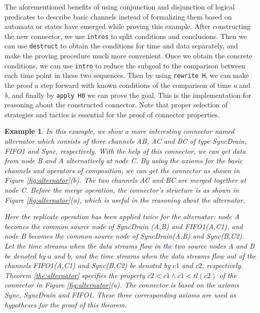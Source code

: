 \documentclass[preprint,3p]{elsarticle}
\newcommand{\liyi}[1]{\textcolor{blue}{#1}}
\newcommand{\xy}[1]{{#1}}
\newtheorem{example}{Example}[section]
\begin{document}
\xy{The aforementioned benefits of using conjunction and disjunction of logical predicates to describe basic channels instead of formalizing them based on automata or states have emerged while proving this example.}
After constructing the new connector, we use \texttt{intros} to split conditions and conclusions. Then we can use \texttt{destruct} to obtain the conditions for time and data separately,
and make the proving procedure much more convenient. \xy{Once we obtain the concrete conditions, we can use \texttt{intro} to reduce the subgoal to the comparison between each time point in these two sequences.} Then by using \texttt{rewrite H}, we can make
the proof a step forward with known conditions of the comparison of time \emph{a} and \emph{b}, and finally by
\texttt{apply H0} we can prove the goal. This is the implementation for reasoning about the constructed connector.
Note that proper selection of strategies and tactics is essential for the proof of connector properties.


\begin{example}\label{ex:alternator}
In this example, we show a more interesting connector named \emph{alternator} which consists of three channels \emph{AB}, \emph{AC} and \emph{BC} of type SyncDrain, FIFO1 and Sync, respectively. With the help of this connector, we can get data from node \emph{B} and \emph{A} alternatively at node \emph{C}.
By using the axioms for the basic channels and operators of composition, we can get the connector as shown in Figure \ref{fig:alternator}(b). The two
channels \emph{AC} and \emph{BC} are merged together at node \emph{C}. Before the merge operation, the connector's structure is as shown in
Figure \ref{fig:alternator}(a), which is useful in the reasoning about the alternator.

Here the replicate operation has been applied twice for the alternator: node \emph{A} becomes the common source node of \emph{SyncDrain (A,B)} and \emph{FIFO1(A,C1)}, and node \emph{B} becomes the common source node of \emph{SyncDrain(A,B)} and \emph{Sync(B,C2)}. Let the time streams when the
data streams flow \liyi{in the} two source nodes \emph{A} and \emph{B} be denoted by $a$ and $b$, and the time streams when the data streams
flow out of the channels \emph{FIFO1(A,C1)} and \emph{Sync(B,C2)} be denoted by $c1$ and $c2$, respectively. Theorem \ref{the:alternator}
specifies the property $c2<c1 \wedge c1<tl (c2)$ of the connector in Figure \ref{fig:alternator}(a). The connector is based on the axioms
Sync, SyncDrain and FIFO1. These three corresponding axioms are used as hypotheses for the proof of this theorem.
\end{example}
\end{document}
